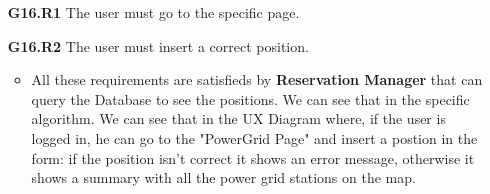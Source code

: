 \begin{itemize}
\item[\textbf{G16.R1}] The user must go to the specific page.
\item[\textbf{G16.R2}] The user must insert a correct position.
\begin{itemize}
\item All these requirements are satisfieds by \textbf{Reservation Manager} that can query the Database to see the positions. We can see that in the specific algorithm. We can see that in the UX Diagram where, if the user is logged in, he can go to the "PowerGrid Page" and insert a postion in the form: if the position isn't correct it shows an error message, otherwise it shows a summary with all the power grid stations on the map. 
\end{itemize}
\end{itemize}

